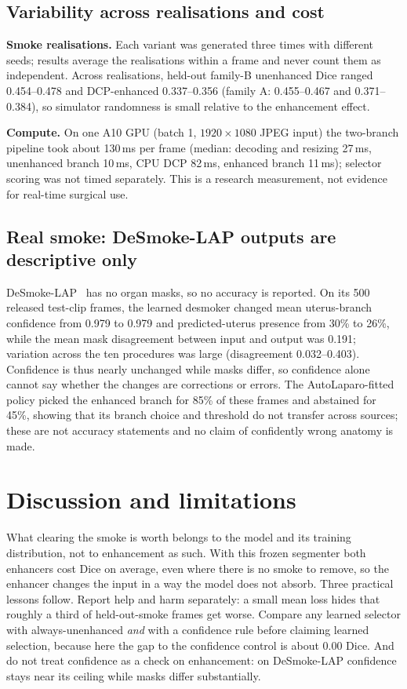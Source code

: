 \documentclass{midl}
\begin{document}
\subsection{Variability across realisations and cost}
\textbf{Smoke realisations.} Each variant was generated three times with different seeds; results average the realisations within a frame and never count them as independent. Across realisations, held-out family-B unenhanced Dice ranged 0.454--0.478 and DCP-enhanced 0.337--0.356 (family A: 0.455--0.467 and 0.371--0.384), so simulator randomness is small relative to the enhancement effect.

\textbf{Compute.} On one A10 GPU (batch 1, $1920{\times}1080$ JPEG input) the two-branch pipeline took about 130\,ms per frame (median: decoding and resizing 27\,ms, unenhanced branch 10\,ms, CPU DCP 82\,ms, enhanced branch 11\,ms); selector scoring was not timed separately. This is a research measurement, not evidence for real-time surgical use.

\subsection{Real smoke: DeSmoke-LAP outputs are descriptive only}\label{sec:ds} DeSmoke-LAP~\citep{pan2022desmoke} has no organ masks, so no accuracy is reported. On its 500 released test-clip frames, the learned desmoker changed mean uterus-branch confidence from 0.979 to 0.979 and predicted-uterus presence from 30\% to 26\%, while the mean mask disagreement between input and output was 0.191; variation across the ten procedures was large (disagreement 0.032--0.403). Confidence is thus nearly unchanged while masks differ, so confidence alone cannot say whether the changes are corrections or errors. The AutoLaparo-fitted policy picked the enhanced branch for 85\% of these frames and abstained for 45\%, showing that its branch choice and threshold do not transfer across sources; these are not accuracy statements and no claim of confidently wrong anatomy is made.


\section{Discussion and limitations}
What clearing the smoke is worth belongs to the model and its training distribution, not to enhancement as such. With this frozen segmenter both enhancers cost Dice on average, even where there is no smoke to remove, so the enhancer changes the input in a way the model does not absorb. Three practical lessons follow. Report help and harm separately: a small mean loss hides that roughly a third of held-out-smoke frames get worse. Compare any learned selector with always-unenhanced \emph{and} with a confidence rule before claiming learned selection, because here the gap to the confidence control is about 0.00 Dice. And do not treat confidence as a check on enhancement: on DeSmoke-LAP confidence stays near its ceiling while masks differ substantially.
\end{document}

